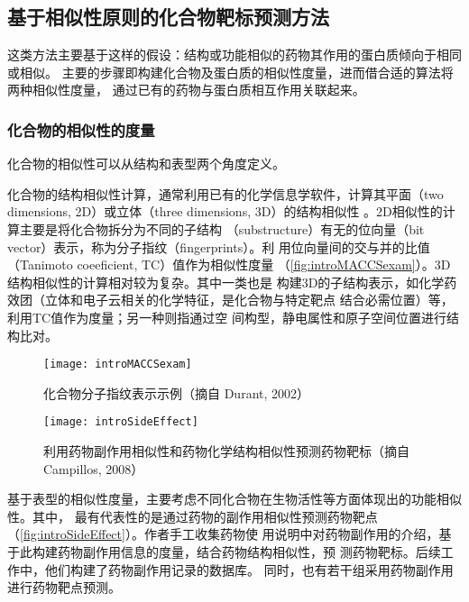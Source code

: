 \subsection{基于相似性原则的化合物靶标预测方法}
\label{subsec:similarity}
这类方法主要基于这样的假设：结构或功能相似的药物其作用的蛋白质倾向于相同或相似。
主要的步骤即构建化合物及蛋白质的相似性度量，进而借合适的算法将两种相似性度量，
通过已有的药物与蛋白质相互作用关联起来。
\subsubsection{化合物的相似性的度量}
化合物的相似性可以从结构和表型两个角度定义。

化合物的结构相似性计算，通常利用已有的化学信息学软件，计算其平面（two
dimensions, 2D）或立体（three dimensions, 3D）的结构相似性
\cite{vilar2014similarity}。2D相似性的计算主要是将化合物拆分为不同的子结构
（substructure）有无的位向量（bit vector）表示，称为分子指纹（fingerprints）。利
用位向量间的交与并的比值（Tanimoto coeeficient, TC）值作为相似性度量
（\autoref{fig:introMACCSexam}）。3D结构相似性的计算相对较为复杂。其中一类也是
构建3D的子结构表示，如化学药效团（立体和电子云相关的化学特征，是化合物与特定靶点
结合必需位置\cite{yang2010pharmacophore}）等，利用TC值作为度量；另一种则指通过空
间构型，静电属性和原子空间位置进行结构比对\cite{dixon2006phase}。
\begin{figure}[htb]
  \centering
  \texttt{[image: introMACCSexam]}
  \caption{化合物分子指纹表示示例（摘自 Durant,
    2002）\cite{durant2002reoptimization}}
  \label{fig:introMACCSexam}
\end{figure}
\begin{figure}[ht]
  \centering
  \texttt{[image: introSideEffect]}
  \caption{利用药物副作用相似性和药物化学结构相似性预测药物靶标（摘自Campillos, 2008）\cite{campillos2008drug}}
  \label{fig:introSideEffect}
\end{figure}
基于表型的相似性度量，主要考虑不同化合物在生物活性等方面体现出的功能相似性。其中，
最有代表性的是通过药物的副作用相似性预测药物靶点
\cite{campillos2008drug}（\autoref{fig:introSideEffect}）。作者手工收集药物使
用说明中对药物副作用的介绍，基于此构建药物副作用信息的度量，结合药物结构相似性，预
测药物靶标。后续工作中，他们构建了药物副作用记录的数据库\cite{kuhn2015sider}。
同时，也有若干组采用药物副作用进行药物靶点预测\cite{takarabe2012drug,
  cheng2013prediction}。

